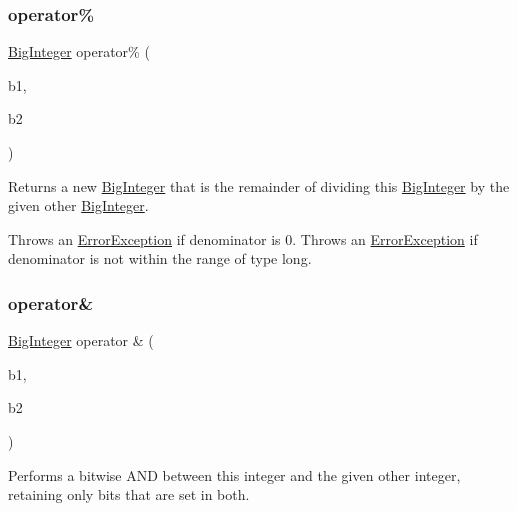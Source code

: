 \subsubsection{\texorpdfstring{operator\%}{operator\%}}
{\footnotesize\ttfamily \mbox{\hyperlink{classBigInteger}{Big\+Integer}} operator\% (\begin{DoxyParamCaption}\item[{const \mbox{\hyperlink{classBigInteger}{Big\+Integer}} \&}]{b1,  }\item[{const \mbox{\hyperlink{classBigInteger}{Big\+Integer}} \&}]{b2 }\end{DoxyParamCaption})\hspace{0.3cm}{\ttfamily [friend]}}



Returns a new \mbox{\hyperlink{classBigInteger}{Big\+Integer}} that is the remainder of dividing this \mbox{\hyperlink{classBigInteger}{Big\+Integer}} by the given other \mbox{\hyperlink{classBigInteger}{Big\+Integer}}. 

Throws an \mbox{\hyperlink{classErrorException}{Error\+Exception}} if denominator is 0. Throws an \mbox{\hyperlink{classErrorException}{Error\+Exception}} if denominator is not within the range of type long. \mbox{\label{classBigInteger_a9264597a13bdae8e51f922f5e86cd98f}} 
\subsubsection{\texorpdfstring{operator\&}{operator\&}}
{\footnotesize\ttfamily \mbox{\hyperlink{classBigInteger}{Big\+Integer}} operator \& (\begin{DoxyParamCaption}\item[{const \mbox{\hyperlink{classBigInteger}{Big\+Integer}} \&}]{b1,  }\item[{const \mbox{\hyperlink{classBigInteger}{Big\+Integer}} \&}]{b2 }\end{DoxyParamCaption})\hspace{0.3cm}{\ttfamily [friend]}}



Performs a bitwise A\+ND between this integer and the given other integer, retaining only bits that are set in both. 

\mbox{\label{classBigInteger_a8e6b00948ebc54ab67bb17c41007fb3c}} 
